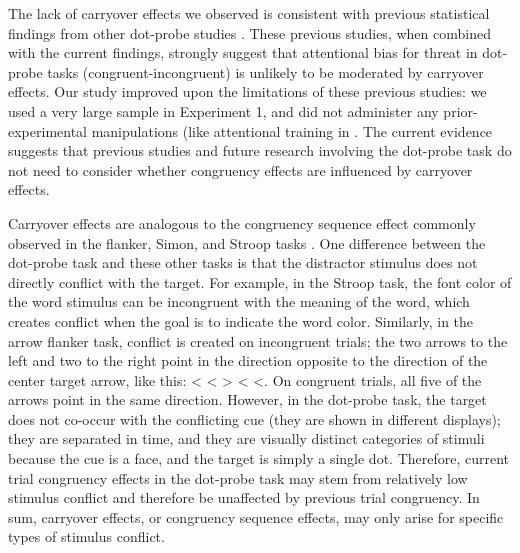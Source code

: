 \documentclass{article}
\begin{document}
The lack of carryover effects we observed is consistent with previous statistical findings from other dot-probe studies \parencite{Gladwin2017, Hill2016, Hill2016}. These previous studies, when combined with the current findings, strongly suggest that attentional bias for threat in dot-probe tasks (congruent-incongruent) is unlikely to be moderated by carryover effects. Our study improved upon the limitations of these previous studies: we used a very large sample in Experiment 1, and did not administer any prior-experimental manipulations (like attentional training in \parencite{Hill2016}. The current evidence suggests that previous studies and future research involving the dot-probe task do not need to consider whether congruency effects are influenced by carryover effects.

Carryover effects are analogous to the congruency sequence effect commonly observed in the flanker, Simon, and Stroop tasks \parencite{Duthoo2014}. One difference between the dot-probe task and these other tasks is that the distractor stimulus does not directly conflict with the target. For example, in the Stroop task, the font color of the word stimulus can be incongruent with the meaning of the word, which creates conflict when the goal is to indicate the word color. Similarly, in the arrow flanker task, conflict is created on incongruent trials; the two arrows to the left and two to the right point in the direction opposite to the direction of the center target arrow, like this: < < > < <. On congruent trials, all five of the arrows point in the same direction. However, in the dot-probe task, the target does not co-occur with the conflicting cue (they are shown in different displays); they are separated in time, and they are visually distinct categories of stimuli because the cue is a face, and the target is simply a single dot. Therefore, current trial congruency effects in the dot-probe task may stem from relatively low stimulus conflict and therefore be unaffected by previous trial congruency. In sum, carryover effects, or congruency sequence effects, may only arise for specific types of stimulus conflict.
\end{document}
